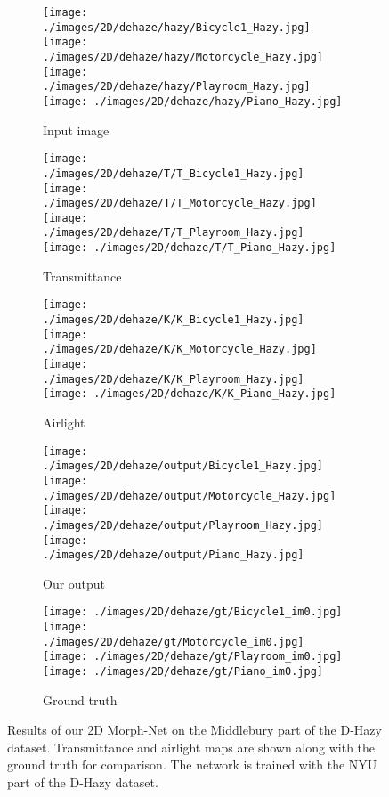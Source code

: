 \documentclass[12pt]{article}
\begin{document}
\begin{figure*}
\begin{subfigure}[t]{0.19\linewidth}
\texttt{[image: ./images/2D/dehaze/hazy/Bicycle1\_Hazy.jpg]}
\texttt{[image: ./images/2D/dehaze/hazy/Motorcycle\_Hazy.jpg]}
\texttt{[image: ./images/2D/dehaze/hazy/Playroom\_Hazy.jpg]}
\texttt{[image: ./images/2D/dehaze/hazy/Piano\_Hazy.jpg]}
\caption{Input image}
\end{subfigure}
\begin{subfigure}[t]{0.19\linewidth}
\texttt{[image: ./images/2D/dehaze/T/T\_Bicycle1\_Hazy.jpg]}
\texttt{[image: ./images/2D/dehaze/T/T\_Motorcycle\_Hazy.jpg]}
\texttt{[image: ./images/2D/dehaze/T/T\_Playroom\_Hazy.jpg]}
\texttt{[image: ./images/2D/dehaze/T/T\_Piano\_Hazy.jpg]}
\caption{Transmittance}
\end{subfigure}
\begin{subfigure}[t]{0.19\linewidth}
\texttt{[image: ./images/2D/dehaze/K/K\_Bicycle1\_Hazy.jpg]}
\texttt{[image: ./images/2D/dehaze/K/K\_Motorcycle\_Hazy.jpg]}
\texttt{[image: ./images/2D/dehaze/K/K\_Playroom\_Hazy.jpg]}
\texttt{[image: ./images/2D/dehaze/K/K\_Piano\_Hazy.jpg]}
\caption{Airlight}
\end{subfigure}
\begin{subfigure}[t]{0.19\linewidth}
\texttt{[image: ./images/2D/dehaze/output/Bicycle1\_Hazy.jpg]}
\texttt{[image: ./images/2D/dehaze/output/Motorcycle\_Hazy.jpg]}
\texttt{[image: ./images/2D/dehaze/output/Playroom\_Hazy.jpg]}
\texttt{[image: ./images/2D/dehaze/output/Piano\_Hazy.jpg]}
\caption{Our output}
\end{subfigure}
\begin{subfigure}[t]{0.19\linewidth}
\texttt{[image: ./images/2D/dehaze/gt/Bicycle1\_im0.jpg]}
\texttt{[image: ./images/2D/dehaze/gt/Motorcycle\_im0.jpg]}
\texttt{[image: ./images/2D/dehaze/gt/Playroom\_im0.jpg]}
\texttt{[image: ./images/2D/dehaze/gt/Piano\_im0.jpg]}
\caption{Ground truth}
\end{subfigure}
\caption{Results of our 2D Morph-Net on the Middlebury part of the D-Hazy dataset. Transmittance and airlight maps are shown along with the ground truth for comparison. The network is trained with the NYU part of the D-Hazy dataset.}
\label{qual_ntire}
\end{figure*}
\end{document}
